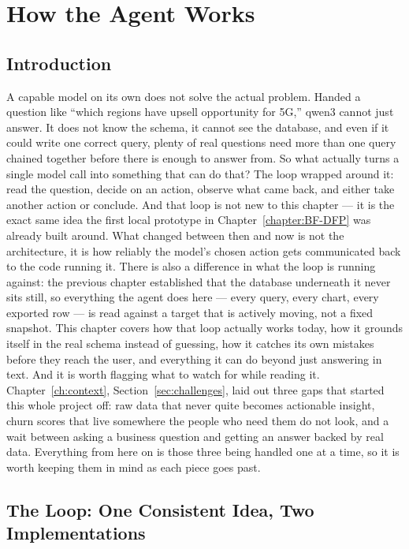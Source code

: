 \chapter{How the Agent Works}\label{ch:agent}

\section*{Introduction}

A capable model on its own does not solve the actual problem. Handed a
question like ``which regions have upsell opportunity for 5G,'' qwen3
cannot just answer. It does not know the schema, it cannot see the
database, and even if it could write one correct query, plenty of real
questions need more than one query chained together before there is
enough to answer from. So what actually turns a single model call into
something that can do that? The loop wrapped around it: read the
question, decide on an action, observe what came back, and either take
another action or conclude. And that loop is not new to this chapter ---
it is the exact same idea the first local prototype in Chapter~\ref{chapter:BF-DFP} was
already built around. What changed between then and now is not the
architecture, it is how reliably the model's chosen action gets
communicated back to the code running it. There is also a difference in
what the loop is running against: the previous chapter established that
the database underneath it never sits still, so everything the agent
does here --- every query, every chart, every exported row --- is read
against a target that is actively moving, not a fixed snapshot. This
chapter covers how that loop actually works today, how it grounds
itself in the real schema instead of guessing, how it catches its own
mistakes before they reach the user, and everything it can do beyond
just answering in text. And it is worth flagging what to watch for while reading
it. Chapter~\ref{ch:context}, Section~\ref{sec:challenges}, laid out three gaps
that started this whole project off: raw data that never quite becomes actionable
insight, churn scores that live somewhere the people who need them do not look,
and a wait between asking a business question and getting an answer backed by
real data. Everything from here on is those three being handled one at a time, so
it is worth keeping them in mind as each piece goes past.

\section{The Loop: One Consistent Idea, Two Implementations}

